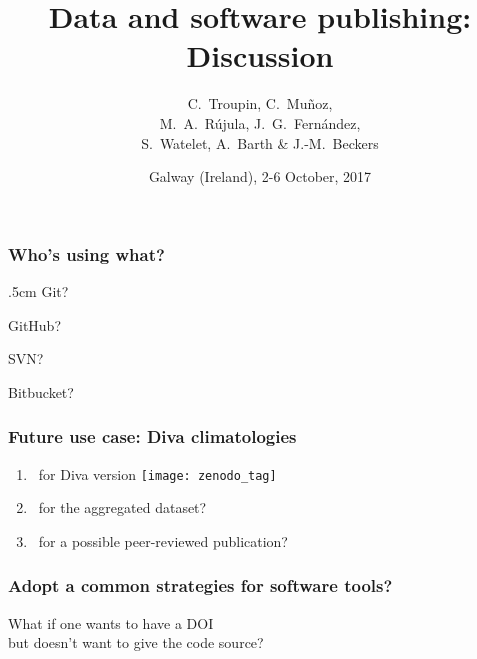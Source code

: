 


\title{Data and software publishing:\\
Discussion}
\author[C.~Troupin]{C.~Troupin, C.~Muñoz,\\ M.~A.~R\'{u}jula, J.~G.~Fern\'{a}ndez,\\ S.~Watelet, A.~Barth \& J.-M.~Beckers}
\date{Galway (Ireland), 2-6 October, 2017}
  



\begin{frame}
\maketitle
\end{frame}

\begin{frame}
\frametitle{Who's using what?}
\parskip .5cm
Git?

GitHub?

SVN?

Bitbucket?


\end{frame}

\begin{frame}
\frametitle{Future use case: Diva climatologies}

\begin{enumerate}
\item \aiDoi~for Diva version \hfill \texttt{[image: zenodo\_tag]}
\item \aiDoi~for the aggregated dataset? 
\item \aiDoi~for a possible peer-reviewed publication?
\end{enumerate}

\end{frame}


\begin{frame}[c]
\frametitle{Adopt a common strategies for software tools?}

What if one wants to have a DOI\\
but doesn't want to give the code source?

\end{frame}

